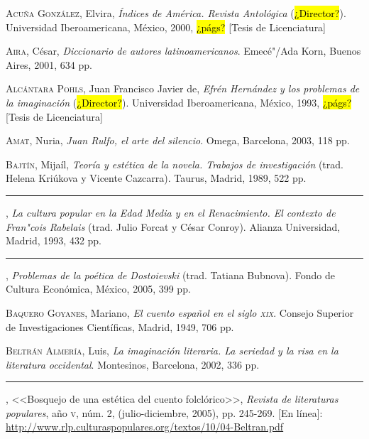 \documentclass[14pt,twoside,final]{extbook} %
\begin{document}
\textsc{Acuña González}, Elvira, \emph{Índices de \emph{América}. Revista Antológica} (\hl{¿Director?}). Universidad Iberoamericana, México, 2000, \hl{¿págs?} [Tesis de Licenciatura]\label{bib:acuña2000}

\textsc{Aira}, César, \emph{Diccionario de autores latinoamericanos}. Emecé"/Ada Korn, Buenos Aires, 2001, 634 pp.\label{bib:aira2001}

\textsc{Alcántara Pohls}, Juan Francisco Javier de, \emph{Efrén Hernández y los problemas de la imaginación} (\hl{¿Director?}). Universidad Iberoamericana, México, 1993,  \hl{¿págs?} [Tesis de Licenciatura]\label{bib:alcantara1993}

\textsc{Amat}, Nuria, \emph{Juan Rulfo, el arte del silencio}. Omega, Barcelona, 2003, 118 pp.\label{bib:amat2003}

\textsc{Bajtín}, Mijaíl, \emph{Teoría y estética de la novela. Trabajos de investigación} (trad. Helena Kriúkova y Vicente Cazcarra). Taurus, Madrid, 1989, 522 pp.\label{bib:bajtin1989}

\rule{1cm}{0.4pt}, \emph{La cultura popular en la Edad Media y en el Renacimiento. El contexto de Fran"cois Rabelais} (trad. Julio Forcat y César Conroy). Alianza Universidad, Madrid, 1993, 432 pp.\label{bib:bajtin1993}

\rule{1cm}{0.4pt}, \emph{Problemas de la poética de Dostoievski} (trad. Tatiana Bubnova). Fondo de Cultura Económica, México, 2005, 399 pp.\label{bib:bajtin2005}

\textsc{Baquero Goyanes}, Mariano, \emph{El cuento español en el siglo \textsc{xix}}. Consejo Superior de Investigaciones Científicas, Madrid, 1949, 706 pp.\label{bib:baquero1949}

\textsc{Beltrán Almería}, Luis, \emph{La imaginación literaria. La seriedad y la risa en la literatura occidental}. Montesinos, Barcelona, 2002, 336 pp.\label{bib:beltran2002}

\rule{1cm}{0.4pt}, <<Bosquejo de una estética del cuento folclórico>>, \emph{Revista de literaturas populares}, año \textsc{v}, núm. 2, (julio-diciembre, 2005), pp. 245-269. [En línea]: \url{http://www.rlp.culturaspopulares.org/textos/10/04-Beltran.pdf}\label{bib:beltran2005}
\end{document}

